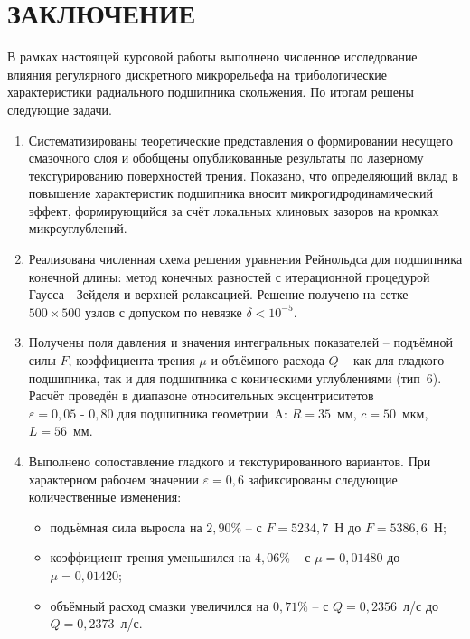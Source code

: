 \section*{ЗАКЛЮЧЕНИЕ}
{}

В рамках настоящей курсовой работы выполнено численное исследование влияния регулярного дискретного микрорельефа на трибологические характеристики радиального подшипника скольжения. По итогам решены следующие задачи.

\begin{enumerate}
    \item Систематизированы теоретические представления о формировании несущего смазочного слоя и обобщены опубликованные результаты по лазерному текстурированию поверхностей трения. Показано, что определяющий вклад в повышение характеристик подшипника вносит микрогидродинамический эффект, формирующийся за счёт локальных клиновых зазоров на кромках микроуглублений.

    \item Реализована численная схема решения уравнения Рейнольдса для подшипника конечной длины: метод конечных разностей с итерационной процедурой Гаусса - Зейделя и верхней релаксацией. Решение получено на сетке $500 \times 500$ узлов с допуском по невязке $\delta < 10^{-5}$.

    \item Получены поля давления и значения интегральных показателей -- подъёмной силы $F$, коэффициента трения $\mu$ и объёмного расхода $Q$ -- как для гладкого подшипника, так и для подшипника с коническими углублениями (тип~6). Расчёт проведён в диапазоне относительных эксцентриситетов $\varepsilon = 0{,}05\text{ - }0{,}80$ для подшипника геометрии~A: $R = 35$~мм, $c = 50$~мкм, $L = 56$~мм.

    \item Выполнено сопоставление гладкого и текстурированного вариантов. При характерном рабочем значении $\varepsilon = 0{,}6$ зафиксированы следующие количественные изменения:
    \begin{itemize}
        \item подъёмная сила выросла на $2{,}90$\% -- с $F = 5234{,}7$~Н до $F = 5386{,}6$~Н;
        \item коэффициент трения уменьшился на $4{,}06$\% -- с $\mu = 0{,}01480$ до $\mu = 0{,}01420$;
        \item объёмный расход смазки увеличился на $0{,}71$\% -- с $Q = 0{,}2356$~л/с до $Q = 0{,}2373$~л/с.
    \end{itemize}
\end{enumerate}

